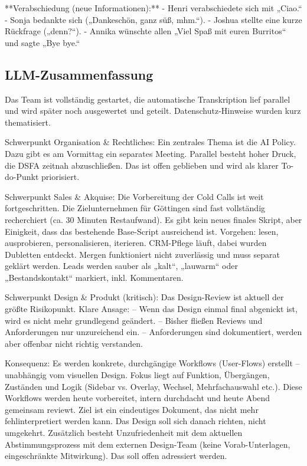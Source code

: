 **Verabschiedung (neue Informationen):**  
- Henri verabschiedete sich mit „Ciao.“  
- Sonja bedankte sich („Dankeschön, ganz süß, mhm.“).  
- Joshua stellte eine kurze Rückfrage („denn?“).  
- Annika wünschte allen „Viel Spaß mit euren Burritos“ und sagte „Bye bye.“

\subsection{LLM-Zusammenfassung}
\label{app:Daily1_llm}
Das Team ist vollständig gestartet, die automatische Transkription lief parallel und wird später noch ausgewertet und geteilt. Datenschutz-Hinweise wurden kurz thematisiert.

Schwerpunkt Organisation \& Rechtliches:
Ein zentrales Thema ist die AI Policy. Dazu gibt es am Vormittag ein separates Meeting. Parallel besteht hoher Druck, die DSFA zeitnah abzuschließen. Das ist offen geblieben und wird als klarer To-do-Punkt priorisiert.

Schwerpunkt Sales \& Akquise:
Die Vorbereitung der Cold Calls ist weit fortgeschritten. Die Zielunternehmen für Göttingen sind fast vollständig recherchiert (ca. 30 Minuten Restaufwand).
Es gibt kein neues finales Skript, aber Einigkeit, dass das bestehende Base-Script ausreichend ist. Vorgehen: lesen, ausprobieren, personalisieren, iterieren.
CRM-Pflege läuft, dabei wurden Dubletten entdeckt. Mergen funktioniert nicht zuverlässig und muss separat geklärt werden. Leads werden sauber als „kalt“, „lauwarm“ oder „Bestandskontakt“ markiert, inkl. Kommentaren.

Schwerpunkt Design \& Produkt (kritisch):
Das Design-Review ist aktuell der größte Risikopunkt. Klare Ansage:
– Wenn das Design einmal final abgenickt ist, wird es nicht mehr grundlegend geändert.
– Bisher fließen Reviews und Anforderungen nur unzureichend ein.
– Anforderungen sind dokumentiert, werden aber offenbar nicht richtig verstanden.

Konsequenz:
Es werden konkrete, durchgängige Workflows (User-Flows) erstellt – unabhängig vom visuellen Design. Fokus liegt auf Funktion, Übergängen, Zuständen und Logik (Sidebar vs. Overlay, Wechsel, Mehrfachauswahl etc.).
Diese Workflows werden heute vorbereitet, intern durchdacht und heute Abend gemeinsam reviewt. Ziel ist ein eindeutiges Dokument, das nicht mehr fehlinterpretiert werden kann. Das Design soll sich danach richten, nicht umgekehrt.
Zusätzlich besteht Unzufriedenheit mit dem aktuellen Abstimmungsprozess mit dem externen Design-Team (keine Vorab-Unterlagen, eingeschränkte Mitwirkung). Das soll offen adressiert werden.

